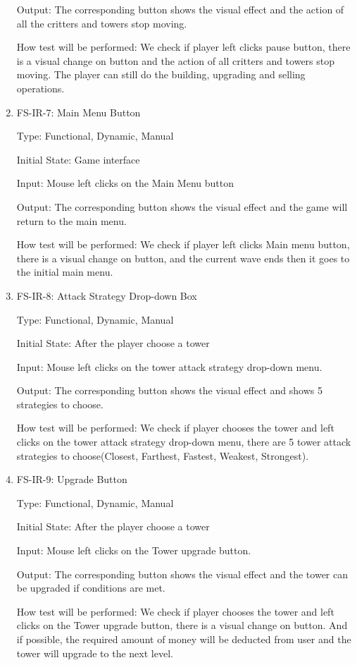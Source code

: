 \documentclass[12pt]{article}
\begin{document}
\begin{enumerate}
	Output: The corresponding button shows the visual effect and the action of all the critters and towers stop moving.
	
	How test will be performed: We check if player left clicks pause button, there is a visual change on button and the action of all critters and towers stop moving. The player can still do the building, upgrading and selling operations.
	
	
	
	\item{FS-IR-7: Main Menu Button}
	
    Type: Functional, Dynamic, Manual

	Initial State: Game interface

	Input: Mouse left clicks on the Main Menu button

	Output: The corresponding button shows the visual effect and the game will return to the main menu.

	How test will be performed: We check if player left clicks Main menu button, there is a visual change on button, and the current wave ends then it goes to the initial main menu.


	\item{FS-IR-8: Attack Strategy Drop-down Box}
					
	Type: Functional, Dynamic, Manual
					
	Initial State: After the player choose a tower
					
	Input: Mouse left clicks on the tower attack strategy drop-down menu.
					
	Output: The corresponding button shows the visual effect and shows 5 strategies to choose.
					
	How test will be performed: We check if player chooses the tower and left clicks on the tower attack strategy drop-down menu, there are 5 tower attack strategies to choose(Closest, Farthest, Fastest, Weakest, Strongest).
	
	\item{FS-IR-9: Upgrade Button}
					
	Type: Functional, Dynamic, Manual
					
	Initial State: After the player choose a tower
					
	Input: Mouse left clicks on the Tower upgrade button.
					
	Output: The corresponding button shows the visual effect and the tower can be upgraded if conditions are met.
					
	How test will be performed: We check if player chooses the tower and left clicks on the Tower upgrade button, there is a visual change on button. And if possible, the required amount of money will be deducted from user and the tower will upgrade to the next level.
	

\end{enumerate}
\end{document}
